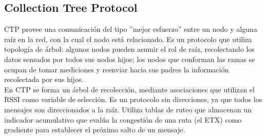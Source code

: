 



\subsection{Collection Tree Protocol}
CTP \cite{TEP123} provee una comunicación del tipo ''mejor esfuerzo'' entre un nodo y alguna raíz en la red, con la cual el nodo está relacionado. Es un protocolo que utiliza topología de árbol: algunos nodos pueden asumir el rol de raíz, recolectando los datos sensados por todos sus nodos hijos; los nodos que conforman las ramas se ocupan de tomar mediciones y reenviar hacia sus padres la información recolectada por sus hijos.\\

En CTP se forma un árbol de recolección, mediante asociaciones que utilizan el RSSI como variable de selección. Es un protocolo sin direcciones, ya que todos los mensajes son direccionados a la raíz. Utiliza tablas de ruteo que almacenan un indicador acumulativo que evalúa la congestión de una ruta (el ETX) como gradiente para establecer el próximo salto de un mensaje.\\

